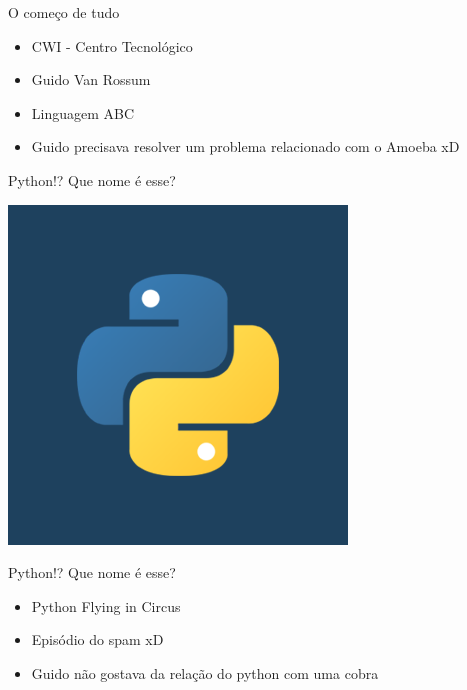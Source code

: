 \begin{frame}{O começo de tudo}
    \begin{itemize}
        \item  CWI - Centro Tecnológico
        \item Guido Van Rossum
        \item Linguagem ABC
        \item Guido precisava resolver um problema relacionado com o Amoeba xD
    \end{itemize}
\end{frame}
%
\begin{frame}{Python!? Que nome é esse? }
	\begin{center}
		\includegraphics[scale=0.5]{img/python.png}
	\end{center}
\end{frame}

\begin{frame}{Python!? Que nome é esse? }
    \begin{itemize}
        \item Python Flying in Circus
        \item Episódio do spam xD
		\item Guido não gostava da relação do python com uma cobra        
    \end{itemize}
\end{frame}
%

